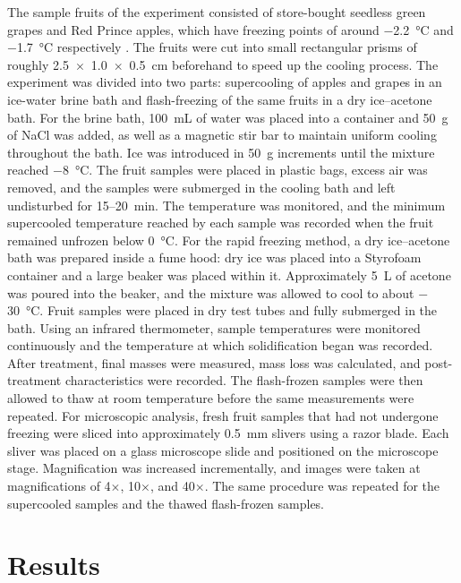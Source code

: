 The sample fruits of the experiment consisted of store-bought seedless
green grapes and Red Prince apples, which have freezing points of around
$-$2.2~°C and $-$1.7~°C respectively \cite{zhao2025, wflo2018}. The
fruits were cut into small rectangular prisms of roughly 2.5~$\times$~1.0~$\times$~0.5~cm
beforehand to speed up the cooling process. The experiment was divided into two parts: supercooling of apples and grapes in an ice-water brine bath and flash-freezing of the same fruits in a dry ice--acetone bath. For the brine bath, 100~mL of water was placed into a container and 50~g of NaCl was added, as well as a magnetic stir bar to maintain uniform cooling throughout the bath. Ice was introduced in 50~g increments until the mixture reached $-$8~°C. The fruit samples were placed in plastic bags, excess air was removed, and the samples were submerged in the cooling bath and left undisturbed for 15--20~min. The temperature was monitored, and the minimum supercooled temperature reached by each sample was recorded when the fruit remained unfrozen below 0~°C. For the rapid freezing method, a dry ice--acetone bath was prepared inside a fume hood: dry ice was placed into a Styrofoam container and a large beaker was placed within it. Approximately 5~L of acetone was poured into the beaker, and the mixture was allowed to cool to about $-$30~°C. Fruit samples were placed in dry test tubes and fully submerged in the bath. Using an infrared thermometer, sample temperatures were monitored continuously and the temperature at which solidification began was recorded. After treatment, final masses were measured, mass loss was calculated, and post-treatment characteristics were recorded. The flash-frozen samples were then allowed to thaw at room temperature before the same measurements were repeated. For microscopic analysis, fresh fruit samples that had not undergone freezing were sliced into approximately 0.5~mm slivers using a razor blade. Each sliver was placed on a glass microscope slide and positioned on the microscope stage. Magnification was increased incrementally, and images were taken at magnifications of 4$\times$, 10$\times$, and 40$\times$. The same procedure was repeated for the supercooled samples and the thawed flash-frozen samples.

\section{Results}

